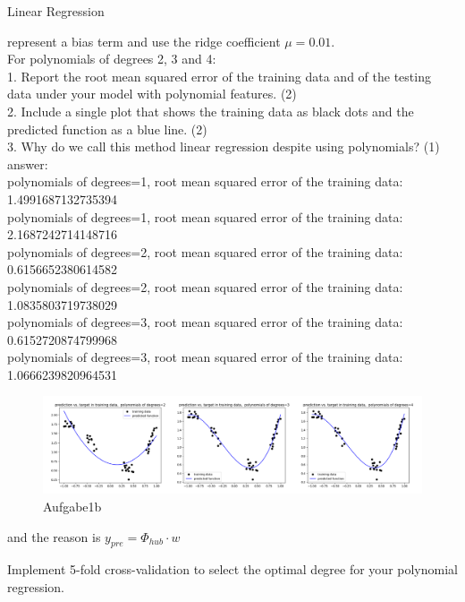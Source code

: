 \documentclass[
	ngerman,
     solution=true
	]{tudaexercise}
\begin{document}
\begin{task}{Linear Regression}
\begin{subtask}[1b)]
represent a bias term and use the ridge coefficient $ \mu = 0.01$.\\[15pt]
For polynomials of degrees 2, 3 and 4:\\
1. Report the root mean squared error of the training data and of the testing data under your model with polynomial
features. (2)\\[15pt]
2. Include a single plot that shows the training data as black dots and the predicted function as a blue line. (2)\\[15pt]
3. Why do we call this method linear regression despite using polynomials? (1)
\\[15pt]
answer:\\[15pt]
polynomials of degrees=1, root mean squared error of the training data: 1.4991687132735394\\
polynomials of degrees=1, root mean squared error of the training data: 2.1687242714148716\\
polynomials of degrees=2, root mean squared error of the training data: 0.6156652380614582\\
polynomials of degrees=2, root mean squared error of the training data: 1.0835803719738029\\
polynomials of degrees=3, root mean squared error of the training data: 0.6152720874799968\\
polynomials of degrees=3, root mean squared error of the training data: 1.0666239820964531\\
\begin{figure}[H] 
\centering 
\includegraphics[width=1\textwidth]{Aufgabe_1b.png} 
\caption{Aufgabe1b } 
\label{Fig.main2}
\end{figure}
and the reason is $y_{pre} = \Phi_{hub}\cdot w$
\end{subtask}
\begin{subtask}[1c)]
Implement 5-fold cross-validation to select the optimal degree for your polynomial regression.\\

\end{subtask}
\end{task}
\end{document}
